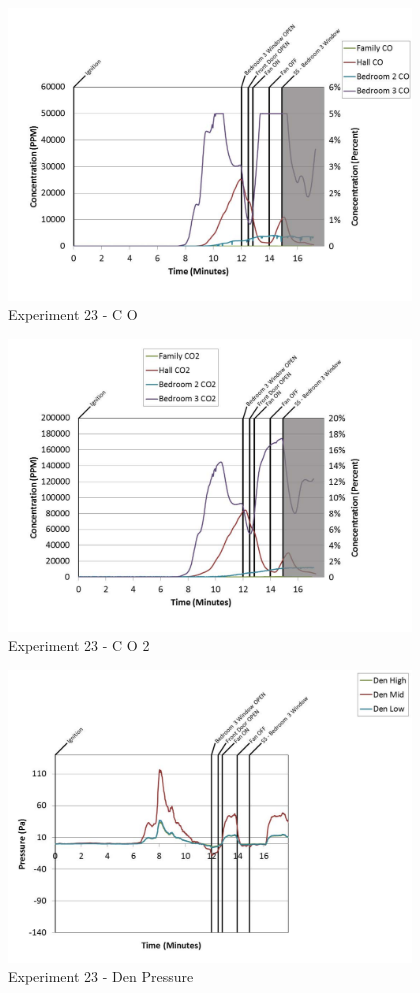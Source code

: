 \documentclass{article}
\begin{document}
\begin{appendices}
	\begin{figure}[h!]
		\centering
		\includegraphics[height=3.05in]{0_Images/Results_Charts/Exp_23_Charts/CO.pdf}
		\caption{Experiment 23 - C O}
	\end{figure}
 
	\clearpage

	\begin{figure}[h!]
		\centering
		\includegraphics[height=3.05in]{0_Images/Results_Charts/Exp_23_Charts/CO2.pdf}
		\caption{Experiment 23 - C O 2}
	\end{figure}
 

	\begin{figure}[h!]
		\centering
		\includegraphics[height=3.05in]{0_Images/Results_Charts/Exp_23_Charts/DenPressure.pdf}
		\caption{Experiment 23 - Den Pressure}
	\end{figure}
 

\end{appendices}
\end{document}
